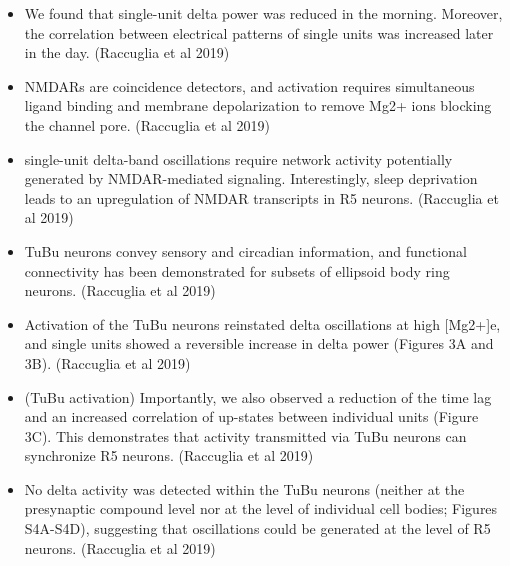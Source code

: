 \documentclass[11pt]{article}
\begin{document}
\begin{itemize}
    \item We found that single-unit delta power was reduced in the morning. Moreover, the correlation between electrical patterns of single units was increased later in the day.
    \parencite{raccugliaNetworkSpecificSynchronizationElectrical2019} (Raccuglia et al 2019)

    \item NMDARs are coincidence detectors, and activation requires simultaneous ligand binding and membrane depolarization to remove Mg2+ ions blocking the channel pore.
    \parencite{raccugliaNetworkSpecificSynchronizationElectrical2019} (Raccuglia et al 2019)

    \item single-unit delta-band oscillations require network activity potentially generated by NMDAR-mediated signaling. Interestingly, sleep deprivation leads to an upregulation of NMDAR transcripts in R5 neurons.
    \parencite{raccugliaNetworkSpecificSynchronizationElectrical2019} (Raccuglia et al 2019)

    \item TuBu neurons convey sensory and circadian information, and functional connectivity has been demonstrated for subsets of ellipsoid body ring neurons.
    \parencite{raccugliaNetworkSpecificSynchronizationElectrical2019} (Raccuglia et al 2019)

    \item Activation of the TuBu neurons reinstated delta oscillations at high [Mg2+]e, and single units showed a reversible increase in delta power (Figures 3A and 3B).
    \parencite{raccugliaNetworkSpecificSynchronizationElectrical2019} (Raccuglia et al 2019)

    \item (TuBu activation) Importantly, we also observed a reduction of the time lag and an increased correlation of up-states between individual units (Figure 3C). This demonstrates that activity transmitted via TuBu neurons can synchronize R5 neurons.
    \parencite{raccugliaNetworkSpecificSynchronizationElectrical2019} (Raccuglia et al 2019)

    \item No delta activity was detected within the TuBu neurons (neither at the presynaptic compound level nor at the level of individual cell bodies; Figures S4A-S4D), suggesting that oscillations could be generated at the level of R5 neurons.
    \parencite{raccugliaNetworkSpecificSynchronizationElectrical2019} (Raccuglia et al 2019)


\end{itemize}
\end{document}
